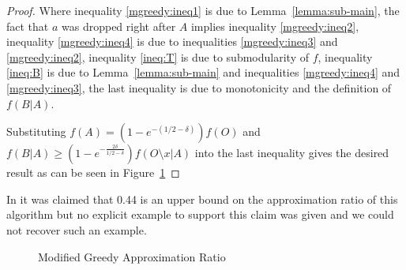 \begin{proof}
	Where inequality \ref{mgreedy:ineq1} is due to Lemma~\ref{lemma:sub-main},
	the fact that $a$ was dropped right after $A$ implies inequality \ref{mgreedy:ineq2},
	inequality \ref{mgreedy:ineq4} is due to inequalities \ref{mgreedy:ineq3} and
	\ref{mgreedy:ineq2},
	inequality \ref{ineq:T} is due to submodularity of $f$,
	inequality \ref{ineq:B} is due to Lemma~\ref{lemma:sub-main} and inequalities
	\ref{mgreedy:ineq4} and \ref{mgreedy:ineq3},
	the last inequality is due to monotonicity and the definition of $f(B|A)$.

	Substituting $f(A) = (1 - e^{-(1/2 - \delta)})f(O)$
	and $f(B|A) \geq (1 - e^{-\frac{2\delta}{1/2 - \delta}})f(O \setminus x | A)$
	into the last inequality gives the desired result as can be seen in Figure~\ref{fig:mgreedy}
\end{proof}

In \cite{khuller1999budgeted} it was claimed that 0.44 is an upper bound on the approximation ratio of this algorithm but no explicit example to support this claim was given and we could not recover such an example.

\begin{figure}
	\caption{
		\label{fig:mgreedy}
		Modified Greedy Approximation Ratio
	}
\end{figure}

